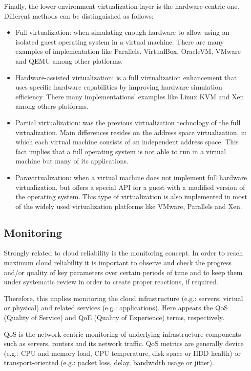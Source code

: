 Finally, the lower environment virtualization layer is the hardware-centric one. Different methods can be distinguished as follows:

\begin{itemize}
\item Full virtualization: when simulating enough hardware to allow using an isolated guest operating system in a virtual machine. There are many examples of implementation like Parallels, VirtualBox, OracleVM, VMware and QEMU among other platforms.
\item Hardware-assisted virtualization: is a full virtualization enhancement that uses specific hardware capabilities by improving hardware simulation efficiency. There many implementations' examples like Linux KVM and Xen among others platforms. 
\item Partial virtualization: was the previous virtualization technology of the full virtualization. Main differences resides on the address space virtualization, in which each virtual machine consists of an independent address space. This fact implies that a full operating system is not able to run in a virtual machine but many of its applications. 
\item Paravirtualization: when a virtual machine does not implement full hardware virtualization, but offers a special API for a guest with a modified version of the operating system. This type of virtualization is also implemented in most of the widely used virtualization platforms like VMware, Parallels and Xen.
\end{itemize}

\subsection{Monitoring}\label{SOA:monitoring}

Strongly related to cloud reliability is the monitoring concept. In order to reach maximum cloud reliability it is important to observe and check the progress and/or quality of key parameters over certain periods of time and to keep them under systematic review in order to create proper reactions, if required.

Therefore, this implies monitoring the cloud infrastructure (e.g.: servers, virtual or physical) and related services (e.g.: applications). Here appears the QoS (Quality of Service) and QoE (Quality of Experience) terms, respectively.

QoS is the network-centric monitoring of underlying infrastructure components such as servers, routers and its network traffic. QoS metrics are generally device (e.g.: CPU and memory load, CPU temperature, disk space or HDD health) or transport-oriented (e.g.: packet loss, delay, bandwidth usage or jitter). 

